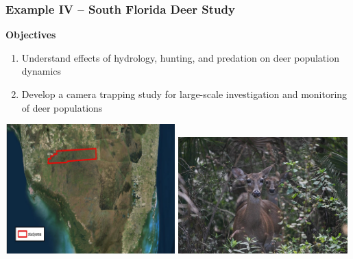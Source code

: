 \documentclass[color=usenames,dvipsnames]{beamer}
\begin{document}
\begin{frame}
  \frametitle{Example IV -- South Florida Deer Study}
  \large
  {\bf Objectives}
  \begin{enumerate}[\bf (1)]
    \item Understand effects of hydrology, hunting, and predation on
    deer population dynamics 
    \item<1-> Develop a camera trapping study for large-scale
    investigation and monitoring of deer populations
  \end{enumerate}
  \vfill
  \includegraphics[width=0.49\textwidth,trim = 0mm 8mm 0mm 0mm, clip]{figs/studyArea} \hfill
  \includegraphics[width=0.49\textwidth]{figs/deer2}
\end{frame}
\end{document}
